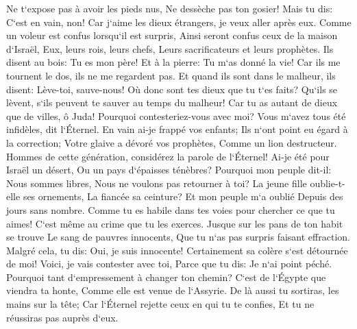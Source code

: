 \verse Ne t`expose pas à avoir les pieds nus, Ne dessèche pas ton gosier! Mais tu dis: C`est en vain, non! Car j`aime les dieux étrangers, je veux aller après eux. 
\verse Comme un voleur est confus lorsqu`il est surpris, Ainsi seront confus ceux de la maison d`Israël, Eux, leurs rois, leurs chefs, Leurs sacrificateurs et leurs prophètes. 
\verse Ils disent au bois: Tu es mon père! Et à la pierre: Tu m`as donné la vie! Car ils me tournent le dos, ils ne me regardent pas. Et quand ils sont dans le malheur, ils disent: Lève-toi, sauve-nous! 
\verse Où donc sont tes dieux que tu t`es faits? Qu`ils se lèvent, s`ils peuvent te sauver au temps du malheur! Car tu as autant de dieux que de villes, ô Juda! 
\verse Pourquoi contesteriez-vous avec moi? Vous m`avez tous été infidèles, dit l`Éternel. 
\verse En vain ai-je frappé vos enfants; Ils n`ont point eu égard à la correction; Votre glaive a dévoré vos prophètes, Comme un lion destructeur. 
\verse Hommes de cette génération, considérez la parole de l`Éternel! Ai-je été pour Israël un désert, Ou un pays d`épaisses ténèbres? Pourquoi mon peuple dit-il: Nous sommes libres, Nous ne voulons pas retourner à toi? 
\verse La jeune fille oublie-t-elle ses ornements, La fiancée sa ceinture? Et mon peuple m`a oublié Depuis des jours sans nombre. 
\verse Comme tu es habile dans tes voies pour chercher ce que tu aimes! C`est même au crime que tu les exerces. 
\verse Jusque sur les pans de ton habit se trouve Le sang de pauvres innocents, Que tu n`as pas surpris faisant effraction. 
\verse Malgré cela, tu dis: Oui, je suis innocente! Certainement sa colère s`est détournée de moi! Voici, je vais contester avec toi, Parce que tu dis: Je n`ai point péché. 
\verse Pourquoi tant d`empressement à changer ton chemin? C`est de l`Égypte que viendra ta honte, Comme elle est venue de l`Assyrie. 
\verse De là aussi tu sortiras, les mains sur la tête; Car l`Éternel rejette ceux en qui tu te confies, Et tu ne réussiras pas auprès d`eux. 

